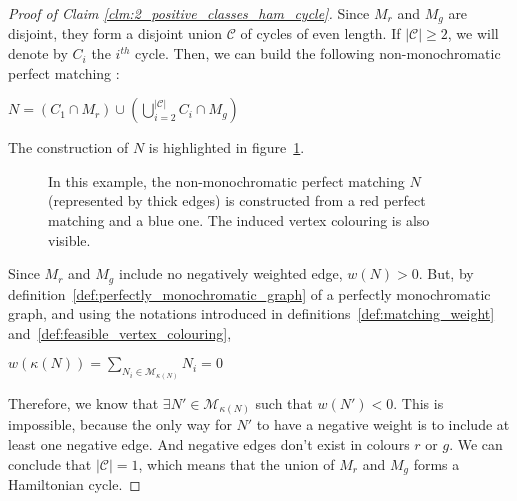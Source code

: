 \begin{proof}[Proof of Claim \ref{clm:2_positive_classes_ham_cycle}]
    Since $M_r$ and $M_g$ are disjoint, they form a disjoint union $\mathcal{C}$ of cycles of even length.
    If $\left| \mathcal{C} \right| \geq 2$, we will denote by $C_i$ the $i^{th}$ cycle.
    Then, we can build the following non-monochromatic perfect matching :
    \begin{center}
        $N = (C_1 \cap M_r) \cup \left(\bigcup\limits_{i=2}^{\left| \mathcal{C} \right|} C_i \cap M_g\right)$
    \end{center}

    The construction of $N$ is highlighted in figure~\ref{fig:demo_unique_neg_ham}.

    \begin{figure}[H]
        \caption{In this example, the non-monochromatic perfect matching $N$ (represented by thick edges) is constructed from a red perfect matching and a blue one. The induced vertex colouring is also visible.}
        \label{fig:demo_unique_neg_ham}
    \end{figure}

    Since $M_r$ and $M_g$ include no negatively weighted edge, $w(N) > 0$.
    But, by definition~\ref{def:perfectly_monochromatic_graph} of a perfectly monochromatic graph, and using the notations introduced in definitions~\ref{def:matching_weight} and~\ref{def:feasible_vertex_colouring},

    \begin{center}
        $w(\kappa(N)) = \sum\limits_{N_i \in \mathcal{M}_{\kappa(N)}} N_i = 0$
    \end{center}

    Therefore, we know that $\exists N' \in \mathcal{M}_{\kappa(N)}$ such that $w(N') < 0$.
    This is impossible, because the only way for $N'$ to have a negative weight is to include at least one negative edge.
    And negative edges don't exist in colours $r$ or $g$.       %
    We can conclude that $\left| \mathcal{C} \right| = 1$, which means that the union of $M_r$ and $M_g$ forms a Hamiltonian cycle.
\end{proof}

